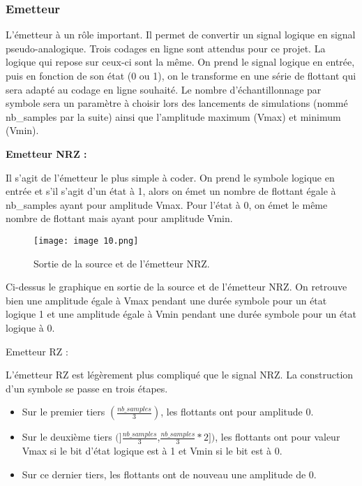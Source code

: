 \subsubsection{Emetteur}

L'émetteur à un rôle important. Il permet de convertir un signal logique en signal pseudo-analogique. Trois codages en ligne sont attendus pour ce projet. La logique qui repose sur ceux-ci sont la même. On prend le signal logique en entrée, puis en fonction de son état (0 ou 1), on le transforme en une série de flottant qui sera adapté au codage en ligne souhaité. Le nombre d'échantillonnage par symbole sera un paramètre à choisir lors des lancements de simulations (nommé nb\_samples par la suite) ainsi que l'amplitude maximum (Vmax) et minimum (Vmin).

\textbf{Emetteur NRZ :}

Il s'agit de l'émetteur le plus simple à coder. On prend le symbole logique en entrée et s'il s'agit d'un état à 1, alors on émet un nombre de flottant égale à nb\_samples ayant pour amplitude Vmax. Pour l'état à 0, on émet le même nombre de flottant mais ayant pour amplitude Vmin.

\begin{figure}[H]
    \centering
    \texttt{[image: image 10.png]}
    \caption{\label{fig:image10}Sortie de la source et de l'émetteur NRZ.}
\end{figure}

Ci-dessus le graphique en sortie de la source et de l'émetteur NRZ. On retrouve bien une amplitude égale à Vmax pendant une durée symbole pour un état logique 1 et une amplitude égale à Vmin pendant une durée symbole pour un état logique à 0.

Emetteur RZ :

L'émetteur RZ est légèrement plus compliqué que le signal NRZ. La construction d'un symbole se passe en trois étapes.

\begin{itemize}
    \item Sur le premier tiers $(\frac{nb\_samples}{3})$, les flottants ont pour amplitude 0.
    \item Sur le deuxième tiers $(]\frac{nb\_samples}{3}$,$\frac{nb\_samples}{3}*2])$, les flottants ont pour valeur Vmax si le bit d'état logique est à 1 et Vmin si le bit est à 0.
    \item Sur ce dernier tiers, les flottants ont de nouveau une amplitude de 0.
\end{itemize}

